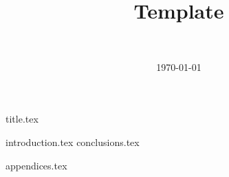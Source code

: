 \documentclass[final]{report} %
\title{Template}
\author{~}
\date{\today}
\begin{document}

{title.tex}
\newpage
\tableofcontents

\newpage
{}
{introduction.tex}
{conclusions.tex}
\newpage
{}

\printbibliography
{appendices.tex}
\end{document}
